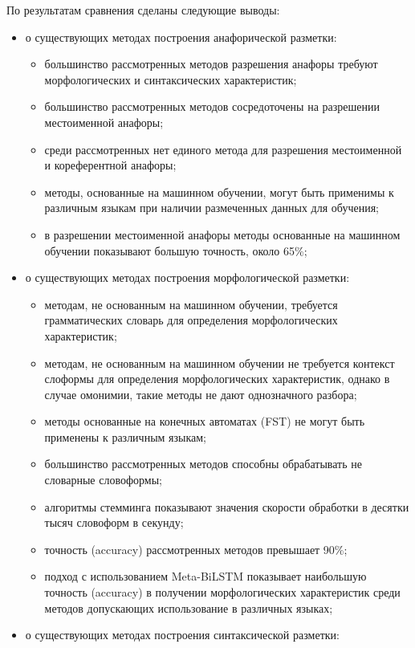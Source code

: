 По результатам сравнения сделаны следующие выводы:
\begin{itemize}
	\item о существующих методах построения анафорической разметки:
	\begin{itemize}
		\item большинство рассмотренных методов разрешения анафоры требуют морфологических и синтаксических характеристик;
		\item большинство рассмотренных методов сосредоточены на разрешении местоименной анафоры;
		\item среди рассмотренных нет единого метода для разрешения местоименной и кореферентной анафоры;
		\item методы, основанные на машинном обучении, могут быть применимы к различным языкам при наличии размеченных данных для обучения;
		\item в разрешении местоименной анафоры методы основанные на машинном обучении показывают большую точность, около 65\%;	
	\end{itemize}
	\item о существующих методах построения морфологической разметки:
	\begin{itemize}
		\item методам, не основанным на машинном обучении, требуется грамматических словарь для определения морфологических характеристик;
		\item методам, не основанным на машинном обучении не требуется контекст слоформы для определения морфологических характеристик, однако в случае омонимии, такие методы не дают однозначного разбора;
		\item методы основанные на конечных автоматах (FST) не могут быть применены к различным языкам;
		\item большинство рассмотренных методов способны обрабатывать не словарные словоформы;
		\item алгоритмы стемминга показывают значения скорости обработки в десятки тысяч словоформ в секунду;
		\item точность (accuracy) рассмотренных методов превышает 90\%;
		\item подход с использованием Meta-BiLSTM показывает наибольшую точность (accuracy) в получении морфологических характеристик среди методов допускающих использование в различных языках;
	\end{itemize}
	\item о существующих методах построения синтаксической разметки:
	\begin{itemize}

\end{itemize}
\end{itemize}
